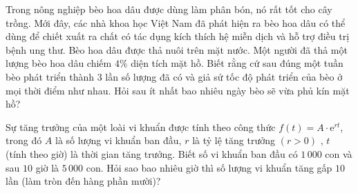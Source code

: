 \begin{ex}%
	Trong nông nghiệp bèo hoa dâu được dùng làm phân bón, nó rất tốt cho cây trồng. Mới đây, các nhà khoa học Việt Nam đã phát hiện ra bèo hoa dâu có thể dùng để chiết xuất ra chất có tác dụng kích thích hệ miễn dịch và hỗ trợ điều trị bệnh ung thư. Bèo hoa dâu được thả nuôi trên mặt nước. Một người đã thả một lượng bèo hoa dâu chiếm $4\%$  diện tích mặt hồ. Biết rằng cứ sau đúng một tuần bèo phát triển thành $3$ lần số lượng đã có và giả sử tốc độ phát triển của bèo ở mọi thời điểm như nhau. Hỏi sau ít nhất bao nhiêu ngày bèo sẽ vừa phủ kín mặt hồ?
\end{ex}
\begin{ex}%
	Sự tăng trưởng của một loài vi khuẩn được tính theo công thức $f(t) =A\cdot \mathrm{e}^{rt}$, trong đó $A$ là số lượng vi khuẩn ban đầu, $r$ là tỷ lệ tăng trưởng $( r > 0)$ , $t$ (tính theo giờ) là thời gian tăng trưởng. Biết số vi khuẩn ban đầu có $1\,000$ con và sau $10$ giờ là $5\,000$ con. Hỏi sao bao nhiêu giờ thì số lượng vi khuẩn tăng gấp $10$ lần (làm tròn đến hàng phần mười)?
\end{ex}
